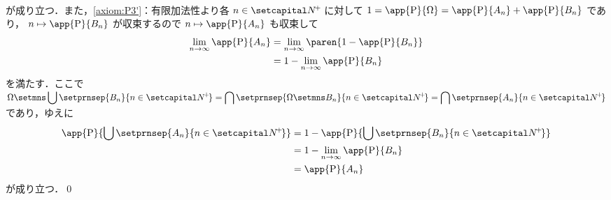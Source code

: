 \documentclass[a4paper,dvipdfmx,leqno]{jsarticle}
\begin{document}
{{\begin{align*}
        \end{align*}
        が成り立つ．また，\eqref{axiom:P3'}：有限加法性より各 $n \in \setNpos$ に対して
        $1 = \app{\Prob}{\Omega} = \app{\Prob}{A_{n}} + \app{\Prob}{B_{n}}$ であり，
        $n \mapsto \app{\Prob}{B_{n}}$ が収束するので $n \mapsto \app{\Prob}{A_{n}}$ も収束して
        \begin{align*}
          \lim_{n \to \infty} \app{\Prob}{A_{n}}
            &= \lim_{n \to \infty} \paren{1 - \app{\Prob}{B_{n}}}
          \\&= 1 - \lim_{n \to \infty} \app{\Prob}{B_{n}}
        \end{align*}
        を満たす．ここで
        $\displaystyle \Omega \setmns \bigcup \setprnsep{B_{n}}{n \in \setNpos}
          = \bigcap \setprnsep{\Omega \setmns B_{n}}{n \in \setNpos}
            = \bigcap \setprnsep{A_{n}}{n \in \setNpos}$
        であり，ゆえに
        \begin{align*}
          \app{\Prob}{\bigcup \setprnsep{A_{n}}{n \in \setNpos}}
            &= 1 - \app{\Prob}{\bigcup \setprnsep{B_{n}}{n \in \setNpos}}
          \\&= 1 - \lim_{n \to \infty} \app{\Prob}{B_{n}}
          \\&= \app{\Prob}{A_{n}}
        \end{align*}
        が成り立つ．\qed
      }
      }
\end{document}
